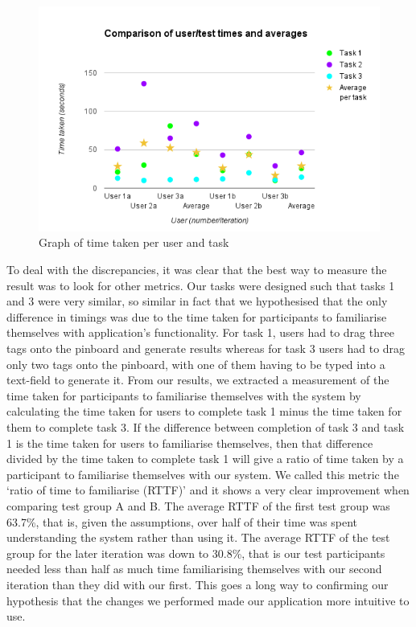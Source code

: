 \documentclass[10pt,a4paper]{article}
\begin{document}
\begin{figure}[H]
	\begin{center}
		\includegraphics[scale=0.5]{graph.png}
		\caption{Graph of time taken per user and task}
		\label{figure:graph}
	\end{center}
\end{figure}

To deal with the discrepancies, it was clear that the best way to measure the result was to look for other metrics. Our tasks were designed such that tasks 1 and 3 were very similar, so similar in fact that we hypothesised that the only difference in timings was due to the time taken for participants to familiarise themselves with application’s functionality. For task 1, users had to drag three tags onto the pinboard and generate results whereas for task 3 users had to drag only two tags onto the pinboard, with one of them having to be typed into a text-field to generate it. From our results, we extracted a measurement of the time taken for participants to familiarise themselves with the system by calculating the time taken for users to complete task 1 minus the time taken for them to complete task 3. If the difference between completion of task 3 and task 1 is the time taken for users to familiarise themselves, then that difference divided by the time taken to complete task 1 will give a ratio of time taken by a participant to familiarise themselves with our system. We called this metric the ‘ratio of time to familiarise (RTTF)’ and it shows a very clear improvement when comparing test group A and B. The average RTTF of the first test group was 63.7\%, that is, given the assumptions, over half of their time was spent understanding the system rather than using it. The average RTTF of the test group for the later iteration was down to 30.8\%, that is our test participants needed less than half as much time familiarising themselves with our second iteration than they did with our first. This goes a long way to confirming our hypothesis that the changes we performed made our application more intuitive to use.
\end{document}
